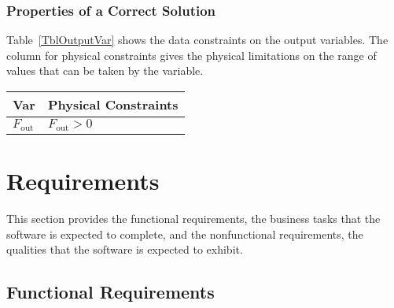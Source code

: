 \documentclass[12pt]{article}
\begin{document}
\noindent 



\subsubsection{Properties of a Correct Solution} \label{sec_CorrectSolution}

\noindent
Table~\ref{TblOutputVar} shows the data constraints on the output variables. 
The column for physical constraints gives the physical limitations on the range 
of values that can be taken by the variable.

\begin{table}[!h]
\caption{Output Data Constraints} \label{TblOutputVar}
\renewcommand{\arraystretch}{1.2}
\noindent 
\begin{longtable*}{l l} 
  \toprule
  \textbf{Var} & \textbf{Physical Constraints} \\
  \midrule 
  $F_\text{out}$ & $F_\text{out} > 0$  \\
  \bottomrule
\end{longtable*}
\end{table}

\section{Requirements}

This section provides the functional requirements, the business tasks that the
software is expected to complete, and the nonfunctional requirements, the
qualities that the software is expected to exhibit.

\subsection{Functional Requirements}
\end{document}
